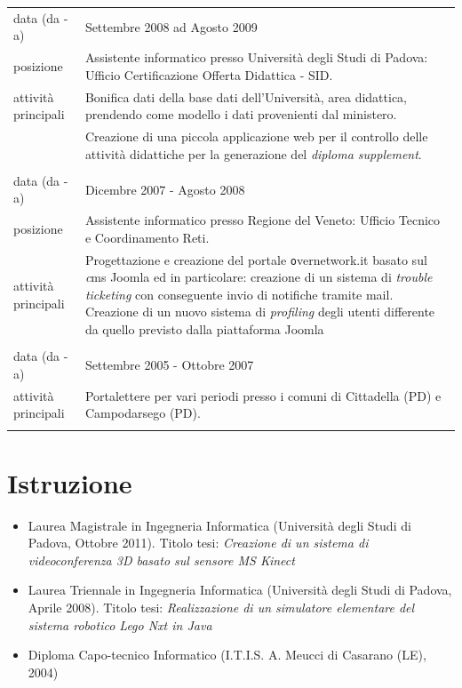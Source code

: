\documentclass[pdftex,a4paper,10pt,twoside,titlepage,italian]{article}
\begin{document}
\begin{tabular}[h]{l p{}}
\footnotesize{data (da - a)} & Settembre 2008 ad Agosto 2009 \\
\footnotesize{posizione} & Assistente informatico presso Università degli Studi di Padova: 
					Ufficio Certificazione Offerta Didattica - SID.\\
\footnotesize{attività principali} & Bonifica dati della base dati dell'Università, area didattica, prendendo come 
		modello i dati provenienti dal ministero.\\
		& Creazione di una piccola applicazione web per il controllo delle attività didattiche
		per la generazione del \textit{diploma supplement}.\\
& \\
\footnotesize{data (da - a)} & Dicembre 2007 - Agosto 2008 \\
\footnotesize{posizione} & Assistente informatico presso Regione del Veneto: Ufficio Tecnico e Coordinamento Reti.\\
\footnotesize{attività principali} & Progettazione e creazione del portale {\texttt overnetwork.it} basato sul {\textit cms Joomla}
		ed in particolare: creazione di un sistema di \textit{trouble ticketing} con conseguente 
		invio di notifiche tramite mail. Creazione di un nuovo sistema di \textit{profiling}
		degli utenti differente da quello previsto dalla piattaforma Joomla\\
& \\
\footnotesize{data (da - a)} & Settembre 2005 - Ottobre 2007 \\
\footnotesize{attività principali} & Portalettere per vari periodi presso i comuni di Cittadella (PD) e Campodarsego (PD).\\
& \\
\end{tabular}

\section*{Istruzione}
\begin{itemize}
	\item Laurea Magistrale in Ingegneria Informatica (Università degli Studi di Padova, Ottobre 2011).
	Titolo tesi: {\itshape Creazione di un sistema di videoconferenza 3D basato sul sensore MS Kinect}
	\item Laurea Triennale in Ingegneria Informatica (Università degli Studi di Padova, Aprile 2008). 
	Titolo tesi: {\itshape Realizzazione di un simulatore elementare del sistema robotico Lego Nxt
	in Java}
	\item Diploma Capo-tecnico Informatico (I.T.I.S. A. Meucci di Casarano (LE), 2004)
\end{itemize}
\end{document}
